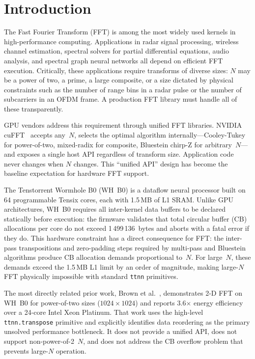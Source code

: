 \documentclass[conference]{IEEEtran}
\begin{document}
\section{Introduction}

The Fast Fourier Transform (FFT) is among the most widely used kernels in
high-performance computing. Applications in radar signal processing, wireless
channel estimation, spectral solvers for partial differential equations, audio
analysis, and spectral graph neural networks all depend on efficient FFT
execution. Critically, these applications require transforms of diverse sizes:
$N$ may be a power of two, a prime, a large composite, or a size dictated by
physical constraints such as the number of range bins in a radar pulse or the
number of subcarriers in an OFDM frame. A production FFT library must handle
all of these transparently.

GPU vendors address this requirement through unified FFT libraries. NVIDIA
cuFFT~\cite{cufft} accepts any~$N$, selects the optimal algorithm
internally---Cooley-Tukey for power-of-two, mixed-radix for composite, Bluestein
chirp-Z for arbitrary~$N$---and exposes a single host API regardless of transform
size. Application code never changes when $N$ changes. This ``unified API''
design has become the baseline expectation for hardware FFT support.

The Tenstorrent Wormhole B0 (WH~B0) is a dataflow neural processor built on 64
programmable Tensix cores, each with 1.5\,MB of L1 SRAM. Unlike GPU
architectures, WH~B0 requires all inter-kernel data buffers to be declared
statically before execution: the firmware validates that total circular buffer
(CB) allocations per core do not exceed 1\,499\,136~bytes and aborts with a
fatal error if they do. This hardware constraint has a direct consequence for
FFT: the inter-pass transpositions and zero-padding steps required by multi-pass
and Bluestein algorithms produce CB allocation demands proportional to~$N$. For
large~$N$, these demands exceed the 1.5\,MB L1 limit by an order of magnitude,
making large-$N$ FFT physically impossible with standard \texttt{ttnn} primitives.

The most directly related prior work, Brown et al.~\cite{brown2025}, demonstrates
2-D FFT on WH~B0 for power-of-two sizes ($1024 \times 1024$) and reports 3.6$\times$
energy efficiency over a 24-core Intel Xeon Platinum. That work uses the
high-level \texttt{ttnn.transpose} primitive and explicitly identifies data
reordering as the primary unsolved performance bottleneck. It does not provide a
unified API, does not support non-power-of-2~$N$, and does not address the CB
overflow problem that prevents large-$N$ operation.
\end{document}
